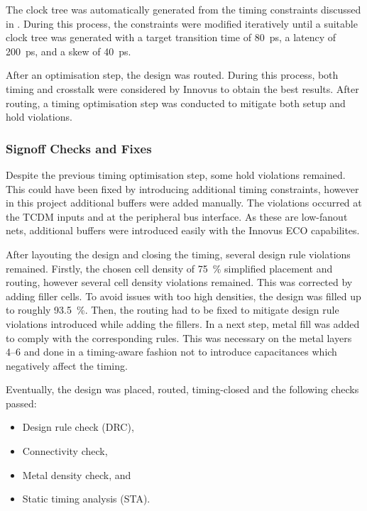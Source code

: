 \documentclass[a4paper, 12pt]{article}
\begin{document}
The clock tree was automatically generated from the timing constraints discussed in . During this process, the constraints were modified iteratively until a suitable clock tree was generated with a target transition time of \SI{80}{ps}, a latency of \SI{200}{ps}, and a skew of \SI{40}{ps}.

After an optimisation step, the design was routed. During this process, both timing and crosstalk were considered by Innovus to obtain the best results. After routing, a timing optimisation step was conducted to mitigate both setup and hold violations.

\subsubsection{Signoff Checks and Fixes} \label{sec:asic:impl:signoff}

Despite the previous timing optimisation step, some hold violations remained. This could have been fixed by introducing additional timing constraints, however in this project additional buffers were added manually. The violations occurred at the TCDM inputs and at the peripheral bus interface. As these are low-fanout nets, additional buffers were introduced easily with the Innovus ECO capabilites.

After layouting the design and closing the timing, several design rule violations remained. Firstly, the chosen cell density of \SI{75}{\percent} simplified placement and routing, however several cell density violations remained. This was corrected by adding filler cells. To avoid issues with too high densities, the design was filled up to roughly \SI{93.5}{\percent}. Then, the routing had to be fixed to mitigate design rule violations introduced while adding the fillers. In a next step, metal fill was added to comply with the corresponding rules. This was necessary on the metal layers \numrange{4}{6} and done in a timing-aware fashion not to introduce capacitances which negatively affect the timing.

Eventually, the design was placed, routed, timing-closed and the following checks passed:

\begin{itemize}
	\item Design rule check (DRC),
	\item Connectivity check, 
	\item Metal density check, and
	\item Static timing analysis (STA).
\end{itemize}
\end{document}
